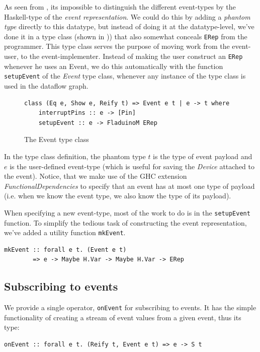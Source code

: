 \documentclass[a4paper, oneside, final]{memoir}
\let\Fref\undefined
\begin{document}
As seen from \Fref{fig:Erep}, its impossible to distinguish the
different event-types by the Haskell-type of the \textit{event
  representation}. We could do this by adding a \textit{phantom type}
directly to this datatype, but instead of doing it at the
datatype-level, we've done it in a type class (shown in
\Fref{fig:Event type class})) that also somewhat conceals \verb|ERep| from
the programmer. This type class serves the purpose of moving work from
the event-user, to the event-implementer. Instead of making the user
construct an \verb|ERep| whenever he uses an Event, we do this
automatically with the function \verb|setupEvent| of the \textit{Event}
type class, whenever any instance of the type class is used in the
dataflow graph.

\begin{figure}
\centering
 \begin{verbatim}
class (Eq e, Show e, Reify t) => Event e t | e -> t where
    interruptPins :: e -> [Pin]
    setupEvent :: e -> FladuinoM ERep
\end{verbatim}
\caption{The Event type class}
\label{fig:Event type class}
\end{figure}

In the type class definition, the phantom type $t$ is the type of
event payload and $e$ is the user-defined event-type (which is useful
for saving the \textit{Device} attached to the event). Notice, that we
make use of the GHC extension \textit{FunctionalDependencies} to
specify that an event has at most one type of payload (i.e. when
we know the event type, we also know the type of its payload).

When specifying a new event-type, most of the work to do is in the
\verb|setupEvent| function. To simplify the tedious task
of constructing the event representation, we've added a utility
function \verb|mkEvent|. 
\begin{verbatim}
mkEvent :: forall e t. (Event e t) 
        => e -> Maybe H.Var -> Maybe H.Var -> ERep
\end{verbatim}

\subsection{Subscribing to events}
We provide a single operator, \verb|onEvent| for subscribing to
events. It has the simple functionality of creating a stream of event
values from a given event, thus its type:

\begin{verbatim}
onEvent :: forall e t. (Reify t, Event e t) => e -> S t
\end{verbatim}
\end{document}
